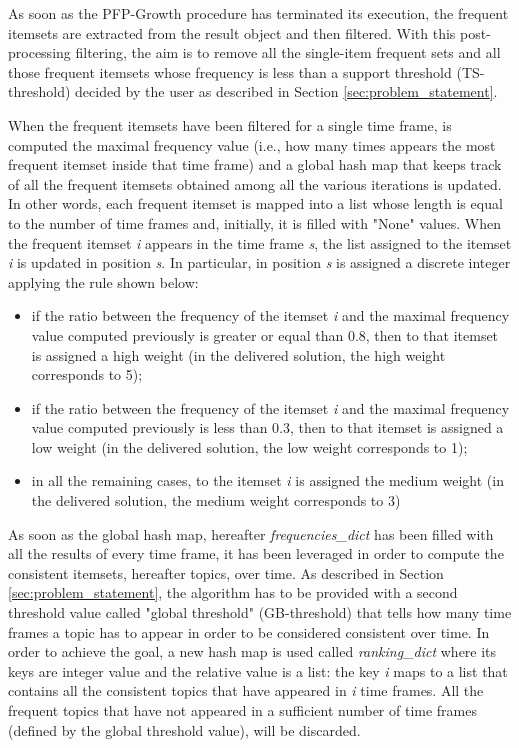 \noindent As soon as the PFP-Growth procedure has terminated its execution, the frequent itemsets are extracted from the result object and then filtered. With this post-processing filtering, the aim is to remove all the single-item frequent sets and all those frequent itemsets whose frequency is less than a support threshold (TS-threshold) decided by the user as described in Section \ref{sec:problem_statement}.

When the frequent itemsets have been filtered for a single time frame, is computed the maximal frequency value (i.e., how many times appears the most frequent itemset inside that time frame) and a global hash map that keeps track of all the frequent itemsets obtained among all the various iterations is updated. In other words, each frequent itemset is mapped into a list whose length is equal to the number of time frames and, initially, it is filled with "None" values. When the frequent itemset \textit{i} appears in the time frame \textit{s}, the list assigned to the itemset \textit{i} is updated in position \textit{s}. In particular, in position \textit{s} is assigned a discrete integer applying the rule shown below:
\begin{itemize}
	\item if the ratio between the frequency of the itemset \textit{i} and the maximal frequency value computed previously is greater or equal than 0.8, then to that itemset is assigned a high weight (in the delivered solution, the high weight corresponds to 5);
	\item if the ratio between the frequency of the itemset \textit{i} and the maximal frequency value computed previously is less than 0.3, then to that itemset is assigned a low weight (in the delivered solution, the low weight corresponds to 1);
	\item in all the remaining cases, to the itemset \textit{i} is assigned the medium weight (in the delivered solution, the medium weight corresponds to 3)
\end{itemize}

As soon as the global hash map, hereafter \textit{frequencies\_dict} has been filled with all the results of every time frame, it has been leveraged in order to compute the consistent itemsets, hereafter topics, over time. As described in Section \ref{sec:problem_statement}, the algorithm has to be provided with a second threshold value called "global threshold" (GB-threshold) that tells how many time frames a topic has to appear in order to be considered consistent over time. In order to achieve the goal, a new hash map is used called \textit{ranking\_dict} where its keys are integer value and the relative value is a list: the key \textit{i} maps to a list that contains all the consistent topics that have appeared in \textit{i} time frames. All the frequent topics that have not appeared in a sufficient number of time frames (defined by the global threshold value), will be discarded. 

